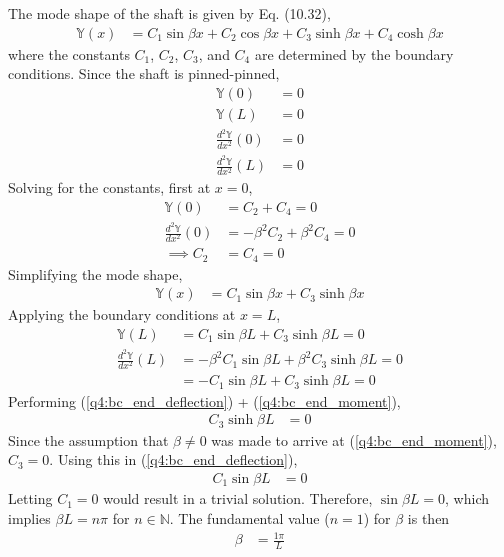 The mode shape of the shaft is given by Eq. (10.32),
\begin{align*}
    \mathbb{Y}(x) &= C_1 \sin \beta x + C_2 \cos \beta x + C_3 \sinh \beta x + C_4 \cosh \beta x 
\end{align*}
where the constants $C_1$, $C_2$, $C_3$, and $C_4$ are determined by the boundary conditions. Since the shaft is pinned-pinned, 
\begin{align*}
    \mathbb{Y}(0) &= 0 \\
    \mathbb{Y}(L) &= 0 \\
    \frac{d^2 \mathbb{Y}}{dx^2}(0) &= 0 \\
    \frac{d^2 \mathbb{Y}}{dx^2}(L) &= 0
\end{align*}
Solving for the constants, first at $x = 0$,
\begin{align*}
    \mathbb{Y}(0) &= C_2 + C_4 = 0 \\
    \frac{d^2 \mathbb{Y}}{dx^2}(0) &= - \beta^2  C_2 + \beta^2 C_4 = 0 \\
    \implies C_2 &= C_4 = 0
\end{align*}
Simplifying the mode shape,
\begin{align*}
    \mathbb{Y}(x) &= C_1 \sin \beta x + C_3 \sinh \beta x
\end{align*}
Applying the boundary conditions at $x = L$,
\begin{align}
    \mathbb{Y}(L) &= C_1 \sin \beta L + C_3 \sinh \beta L = 0 \label{q4:bc_end_deflection} \\
    \frac{d^2 \mathbb{Y}}{dx^2}(L) &= -\beta^2 C_1 \sin \beta L + \beta^2 C_3 \sinh \beta L = 0 \\
    &= - C_1 \sin \beta L + C_3 \sinh \beta L = 0 \label{q4:bc_end_moment}
\end{align}
Performing (\ref{q4:bc_end_deflection}) + (\ref{q4:bc_end_moment}),
\begin{align*}
    C_3 \sinh \beta L &= 0
\end{align*}
Since the assumption that $\beta \neq 0$ was made to arrive at (\ref{q4:bc_end_moment}), $C_3 = 0$. Using this in (\ref{q4:bc_end_deflection}),
\begin{align*}
    C_1 \sin \beta L &= 0
\end{align*}
Letting $C_1 = 0$ would result in a trivial solution. Therefore, $\sin \beta L = 0$, which implies $\beta L = n \pi$ for $n \in \mathbb{N}$. The fundamental value ($n = 1$) for $\beta$ is then
\begin{align*}
    \beta &= \frac{1 \pi}{L}
\end{align*}
